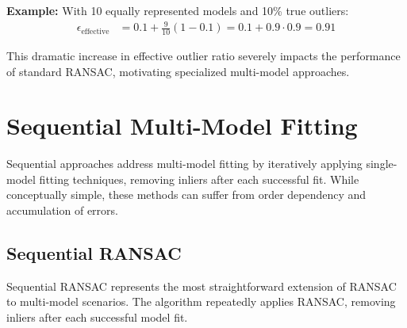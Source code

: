\documentclass[12pt]{article}
\begin{document}
\textbf{Example:} With 10 equally represented models and 10\% true outliers:
\begin{align}
    \epsilon_{\text{effective}} & = 0.1 + \frac{9}{10}(1 - 0.1) = 0.1 + 0.9 \cdot 0.9 = 0.91
\end{align}

This dramatic increase in effective outlier ratio severely impacts the performance of standard RANSAC, motivating specialized multi-model approaches.

\newpage

\section{Sequential Multi-Model Fitting}
\label{sec:sequential_fitting}

Sequential approaches address multi-model fitting by iteratively applying single-model fitting techniques, removing inliers after each successful fit. While conceptually simple, these methods can suffer from order dependency and accumulation of errors.

\subsection{Sequential RANSAC}
\label{subsec:sequential_ransac}

Sequential RANSAC represents the most straightforward extension of RANSAC to multi-model scenarios. The algorithm repeatedly applies RANSAC, removing inliers after each successful model fit.
\end{document}
